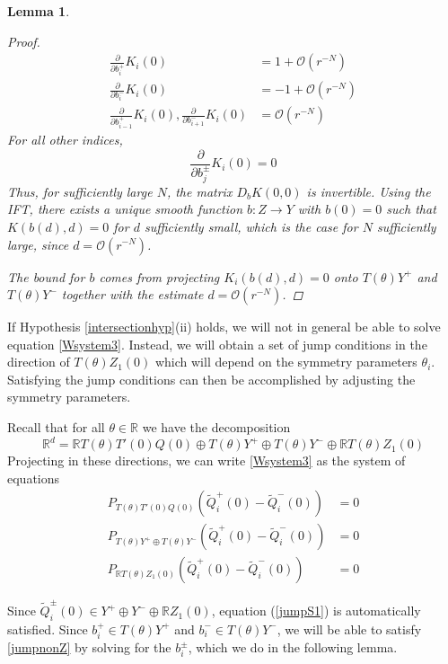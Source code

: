 \documentclass[12pt]{article}
\def\R{{\mathbb R}}
\newtheorem{lemma}{Lemma}
\begin{document}
\begin{lemma}
\begin{proof}
\begin{align*}
\frac{\partial}{\partial b_i^+}K_i(0) &= 1 + \mathcal{O}(r^{-N})  \\
\frac{\partial}{\partial b_i^-}K_i(0) &= -1 + \mathcal{O}(r^{-N}) \\
\frac{\partial}{\partial b_{i-1}^+}K_i(0),
\frac{\partial}{\partial b_{i+1}^-}K_i(0) &= \mathcal{O}(r^{-N})
\end{align*}
For all other indices,
\[
\frac{\partial}{\partial b_j^\pm}K_i(0) = 0
\]
Thus, for sufficiently large $N$, the matrix $D_b K(0,0)$ is invertible. Using the IFT, there exists a unique smooth function $b: Z \rightarrow Y$ with $b(0) = 0$ such that $K(b(d),d) = 0$ for $d$ sufficiently small, which is the case for $N$ sufficiently large, since $d = \mathcal{O}(r^{-N})$.

The bound for $b$ comes from projecting $K_i(b(d), d) = 0$ onto $T(\theta)Y^+$ and $T(\theta)Y^-$ together with the estimate $d = \mathcal{O}(r^{-N})$.
\end{proof}
\end{lemma}

If Hypothesis \ref{intersectionhyp}(ii) holds, we will not in general be able to solve equation \eqref{Wsystem3}. Instead, we will obtain a set of jump conditions in the direction of $T(\theta) Z_1(0)$ which will depend on the symmetry parameters $\theta_i$. Satisfying the jump conditions can then be accomplished by adjusting the symmetry parameters.

Recall that for all $\theta \in \R$ we have the decomposition
\[
\R^d = \R T(\theta) T'(0)Q(0) \oplus T(\theta) Y^+ \oplus T(\theta) Y^- \oplus \R T(\theta) Z_1(0)
\]
Projecting in these directions, we can write \eqref{Wsystem3} as the system of equations
\begin{align}
P_{T(\theta)T'(0)Q(0)}\left( \tilde{Q}_i^+(0) - \tilde{Q}_i^-(0) \right) &= 0 \label{jumpS1} \\
P_{T(\theta)Y^+ \oplus T(\theta)Y^-}\left( \tilde{Q}_i^+(0) - \tilde{Q}_i^-(0) \right) &= 0 \label{jumpnonZ} \\
P_{\R T(\theta)Z_1(0)} \left( \tilde{Q}_i^+(0) - \tilde{Q}_i^-(0) \right) &= 0 \label{jumpZ}
\end{align}

Since $\tilde{Q}_i^\pm(0) \in Y^+ \oplus Y^- \oplus \R Z_1(0)$, equation (\ref{jumpS1}) is automatically satisfied. Since $b_i^+ \in T(\theta) Y^+$ and $b_i^- \in T(\theta) Y^-$, we will be able to satisfy \eqref{jumpnonZ} by solving for the $b_i^\pm$, which we do in the following lemma.
\end{document}
